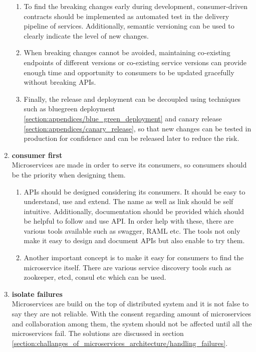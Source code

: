 \begin{enumerate}
\begin{enumerate}
\item To find the breaking changes early during development, consumer-driven contracts should be implemented as automated test in the delivery pipeline of services. Additionally, semantic versioning can be used to clearly indicate the level of new changes.
\item When breaking changes cannot be avoided, maintaining co-existing endpoints of different versions or co-existing service versions can provide enough time and opportunity to consumers to be updated gracefully without breaking \acrshort{API}s.
\item Finally, the release and deployment can be decoupled using techniques such as bluegreen deployment \ref{section:appendices/blue_green_deployment} and canary release \ref{section:appendices/canary_release}, so that new changes can be tested in production for confidence and can be released later to reduce the risk.
\end{enumerate}
\item \textbf{consumer first}\\
Microservices are made in order to serve its consumers, so consumers should be the priority when designing them.
\begin{enumerate}
\item \acrshort{API}s should be designed considering its consumers. It should be easy to understand, use and extend. The name as well as link should be self intuitive. Additionally, documentation should be provided which should be helpful to follow and use \acrshort{API}. In order help with these, there are various tools available such as swagger, RAML etc. The tools not only make it easy to design and document \acrshort{API}s but also enable to try them.\cite{Bloch:2016aa} \cite{Blanchette:2008aa}
\item Another important concept is to make it easy for consumers to find the microservice itself. There are various service discovery tools such as zookeeper, etcd, consul etc which can be used.
\end{enumerate}
\item \textbf{isolate failures}\\
Microservices are build on the top of distributed system and it is not false to say they are not reliable.\cite{Factor:2014aa} With the consent regarding amount of microservices and collaboration among them, the system should not be affected until all the microservices fail. The solutions are discussed in section \ref{section:challanges_of_microservices_architecture/handling_failures}.

\end{enumerate}

